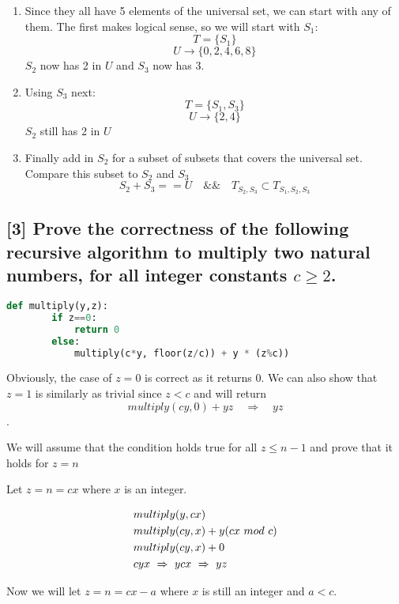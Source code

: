 \documentclass[12pt, letterpaper]{article}
\begin{document}
    \begin{enumerate}
        \item{Since they all have 5 elements of the universal set, we can start with any of them. The first makes logical sense, so we will start with $S_1$: \[T = \{S_1\}\]\[U \rightarrow \{0,2,4,6,8\}\]$S_2$ now has 2 in $U$ and $S_3$ now has 3.}
        \item{Using $S_3$ next: \[T = \{S_1,S_3\}\]\[U \rightarrow \{2,4\}\]$S_2$ still has 2 in $U$}
        \item{Finally add in $S_2$ for a subset of subsets that covers the universal set.\\Compare this subset to $S_2$ and $S_3$\[S_2 + S_3 == U \quad \&\& \quad T_{{S_2},{S_3}} \subset T_{{S_1},{S_2},{S_3}}\]}
    \end{enumerate}

\subsection{[3] Prove the correctness of the following recursive algorithm to multiply two natural numbers, for all integer constants $c \geq 2$.}
    \begin{lstlisting}[language=Python]
    def multiply(y,z):
        if z==0:
            return 0
        else:
            multiply(c*y, floor(z/c)) + y * (z%c))
    \end{lstlisting}
    Obviously, the case of $z=0$ is correct as it returns $0$. We can also show that $z=1$ is similarly as trivial since $z < c$ and will return \[multiply(cy,0) + yz \quad \Rightarrow \quad yz\].

    We will assume that the condition holds true for all $z \leq n-1$ and prove that it holds for $z=n$

    Let $z =n= cx$ where $x$ is an integer.

    \begin{align}\setcounter{equation}{0}
        &multiply(y, cx)\\
        &multiply(cy, x) + y(cx~mod~c)\\
        &multiply(cy, x) + 0\\
        &cyx~\Rightarrow~ycx~\Rightarrow~yz
    \end{align}

    Now we will let $z = n = cx - a$ where $x$ is still an integer and $a<c$.
\end{document}
